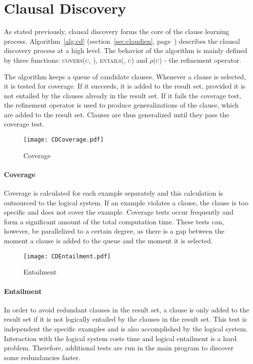 \section{Clausal Discovery}
\label{sec:clausal_discovery_approach}
As stated previously, clausal discovery forms the core of the clause learning process.
Algorithm~\ref{alg:cd} (section~\ref{sec:claudien}, page~\pageref{alg:cd}) describes the clausal discovery process at a high level.
The behavior of the algorithm is mainly defined by three functions: \textsc{covers(c, )}, \textsc{entails(, c)} and \textsc{$\rho$(c)} - the refinement operator.

The algorithm keeps a queue of candidate clauses.
Whenever a clause is selected, it is tested for coverage.
If it succeeds, it is added to the result set, provided it is not entailed by the clauses already in the result set.
If it fails the coverage test, the refinement operator is used to produce generalizations of the clause, which are added to the result set.
Clauses are thus generalized until they pass the coverage test.

\begin{figure}[!htp]

	\caption{Coverage}
	\centering
		\texttt{[image: CDCoverage.pdf]}
	\label{fig:cd_coverage}

\end{figure}

\paragraph{Coverage} 
Coverage is calculated for each example separately and this calculation is outsourced to the logical system.
If an example violates a clause, the clause is too specific and does not cover the example.
Coverage tests occur frequently and form a significant amount of the total computation time.
These tests can, however, be parallelized to a certain degree, as there is a gap between the moment a clause is added to the queue and the moment it is selected.

\begin{figure}[!htp]

	\caption{Entailment}
	\centering
		\texttt{[image: CDEntailment.pdf]}
	\label{fig:cd_entailment}

\end{figure}


\paragraph{Entailment}
In order to avoid redundant clauses in the result set, a clause is only added to the result set if it is not logically entailed by the clauses in the result set.
This test is independent the specific examples and is also accomplished by the logical system.
Interaction with the logical system costs time and logical entailment is a hard problem.
Therefore, additional tests are run in the main program to discover some redundancies faster.

